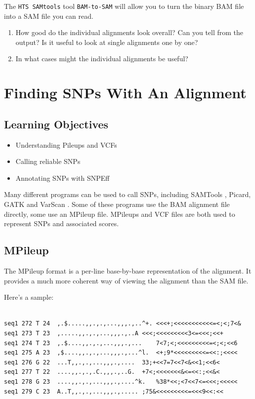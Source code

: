 \documentclass[12pt,]{book}
\providecommand{\tightlist}{%
  \setlength{\itemsep}{0pt}\setlength{\parskip}{0pt}}
\begin{document}
The \texttt{HTS\ SAMtools} tool \texttt{BAM-to-SAM} will allow you to
turn the binary BAM file into a SAM file you can read.

\begin{enumerate}
\def\labelenumi{\arabic{enumi}.}
\tightlist
\item
  How good do the individual alignments look overall? Can you tell from
  the output? Is it useful to look at single alignments one by one?
\item
  In what cases might the individual alignments be useful?
\end{enumerate}

\chapter{Finding SNPs With An
Alignment}\label{finding-snps-with-an-alignment}

\section{Learning Objectives}\label{learning-objectives-3}

\begin{itemize}
\tightlist
\item
  Understanding Pileups and VCFs
\item
  Calling reliable SNPs
\item
  Annotating SNPs with SNPEff
\end{itemize}

Many different programs can be used to call SNPs, including SAMTools
\citep{Li:2009ka}, Picard, GATK \citep{DeSumma:2017kr} and VarScan
\citep{Koboldt:2009dk}. Some of these programs use the BAM alignment
file directly, some use an MPileup file. MPileups and VCF files are both
used to represent SNPs and associated scores.

\section{MPileup}\label{mpileup}

The MPileup format is a per-line base-by-base representation of the
alignment. It provides a much more coherent way of viewing the alignment
than the SAM file.

Here's a sample:

\begin{verbatim}

seq1 272 T 24  ,.$.....,,.,.,...,,,.,..^+. <<<+;<<<<<<<<<<<=<;<;7<&
seq1 273 T 23  ,.....,,.,.,...,,,.,..A <<<;<<<<<<<<<3<=<<<;<<+
seq1 274 T 23  ,.$....,,.,.,...,,,.,...    7<7;<;<<<<<<<<<=<;<;<<6
seq1 275 A 23  ,$....,,.,.,...,,,.,...^l.  <+;9*<<<<<<<<<=<<:;<<<<
seq1 276 G 22  ...T,,.,.,...,,,.,....  33;+<<7=7<<7<&<<1;<<6<
seq1 277 T 22  ....,,.,.,.C.,,,.,..G.  +7<;<<<<<<<&<=<<:;<<&<
seq1 278 G 23  ....,,.,.,...,,,.,....^k.   %38*<<;<7<<7<=<<<;<<<<<
seq1 279 C 23  A..T,,.,.,...,,,.,..... ;75&<<<<<<<<<=<<<9<<:<<
\end{verbatim}
\end{document}
